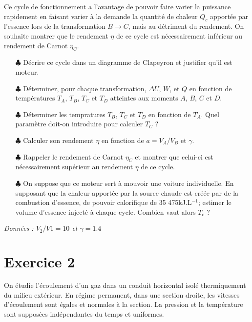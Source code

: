 \documentclass{report}
\begin{document}
Ce cycle de fonctionnement a l'avantage de pouvoir faire varier la puissance rapidement en faisant varier à la demande la quantité de chaleur $Q_c$ apportée par l'essence lors de la transformation $B \rightarrow C$, mais au détriment du rendement. On souhaite montrer que le rendement $\eta$ de ce cycle est nécessairement inférieur au rendement de Carnot $\eta_C$.

\begin{itemize}

	\item[$\clubsuit$] Décrire ce cycle dans un diagramme de Clapeyron et justifier qu'il est moteur.

	\item[$\clubsuit$] Déterminer, pour chaque transformation, $\Delta U$, $W$, et $Q$ en fonction de températures $T_A$, $T_B$, $T_C$ et $T_D$ atteintes aux moments $A$, $B$, $C$ et $D$.
	
	\item[$\clubsuit$] Déterminer les tempratures $T_B$, $T_C$ et $T_D$ en fonction de $T_A$. Quel paramètre doit-on introduire pour calculer $T_C$ ? 
	
	\item[$\clubsuit$]  Calculer son rendement $\eta$ en fonction de $a=V_A/V_B$ et $\gamma$. 
	
	\item[$\clubsuit$] Rappeler le rendement de Carnot $\eta_C$ et montrer que celui-ci est nécessairement supérieur au rendement $\eta$ de ce cycle.
	
	\item[$\clubsuit$] On suppose que ce moteur sert à mouvoir une voiture individuelle. En supposant que la chaleur apportée par la source chaude est créée par de la combustion d'essence, de pouvoir calorifique de 35 475kJ.L$^{-1}$; estimer le volume d'essence injecté à chaque cycle. Combien vaut alors $T_c$ ?
	
\end{itemize}

\textit{Données : $ V_{2}/V{1} = 10$ et $ \gamma=1.4$}

\newpage

\section*{Exercice 2}

On étudie l'écoulement d'un gaz dans un conduit horizontal isolé thermiquement du milieu extérieur. En régime permanent, dans une section droite, les vitesses d'écoulement sont égales et normales à la section. La pression et la température sont supposées indépendantes du temps et uniformes.
\end{document}
